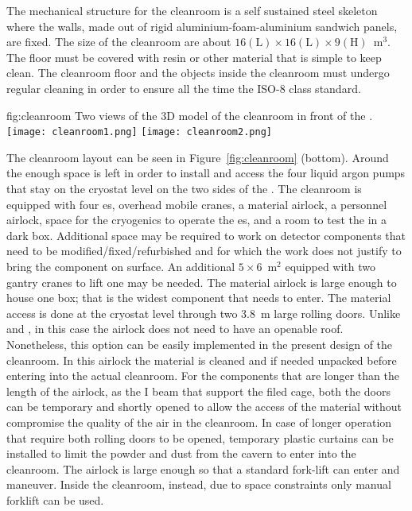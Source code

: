 The mechanical structure for the cleanroom is a self sustained steel skeleton where the walls, made out of rigid aluminium-foam-aluminium sandwich panels, are fixed.
The size of the cleanroom are about $16 \mathrm{(L)} \times 16 \mathrm{(L)} \times 9 \mathrm{(H)}$~m$^3$.
The floor must be covered with resin or other material that is simple to keep clean.
The cleanroom floor and the objects inside the cleanroom must undergo regular cleaning in order to ensure all the time the ISO-8 class standard.

\begin{dunefigure}{fig:cleanroom}
{Two views of the 3D model of the cleanroom in front of the .}
\texttt{[image: cleanroom1.png]}
\texttt{[image: cleanroom2.png]}
\end{dunefigure}

The cleanroom layout can be seen in Figure~\ref{fig:cleanroom} (bottom).
Around the  enough space is left in order to install and access the four liquid argon pumps that stay on the cryostat level on the two sides of the .
The cleanroom is equipped with four  \coldbox{}es, overhead mobile cranes, a material airlock, a personnel airlock, space for the cryogenics to operate the  \coldbox{}es, and a room to test the  in a dark box.
Additional space may be required to work on detector components that need to be modified/fixed/refurbished and for which the work does not justify to bring the component on surface.
An additional $5\times6$~m$^2$ equipped with two gantry cranes to lift one  may be needed.
The material airlock is large enough to house one  box; that is the widest component that needs to enter.
The material access is done at the cryostat level through two 3.8~m large rolling doors.
Unlike  and , in this case the airlock does not need to have an openable roof.
Nonetheless, this option can be easily implemented in the present design of the cleanroom.
In this airlock the material is cleaned and if needed unpacked before entering into the actual cleanroom.
For the components that are longer than the length of the airlock, as the I beam that support the filed cage, both the doors can be temporary and shortly opened to allow the access of the material without compromise the quality of the air in the cleanroom.
In case of longer operation that require both rolling doors to be opened, temporary plastic curtains can be installed to limit the powder and dust from the cavern to enter into the cleanroom.
The airlock is large enough so that a standard fork-lift can enter and maneuver.
Inside the cleanroom, instead, due to space constraints only manual forklift can be used.

